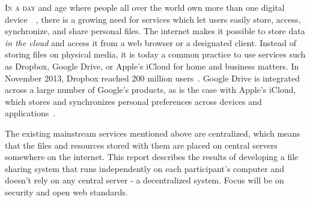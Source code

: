 \lettrine[lines=2, findent=2pt]{I}{n a day} and age where people all over the world own more than one digital device~\cite{OFCOMa:Online}~\cite{OFCOMb:Online}, there is a growing need for services which let users easily store, access, synchronize, and share personal files. The internet makes it possible to store data \emph{in the cloud} and access it from a web browser or a designated client. Instead of storing files on physical media, it is today a common practice to use services such as Dropbox, Google Drive, or Apple's iCloud for home and business matters. In November 2013, Dropbox reached 200 million users~\cite{Constine:2013:Online}. Google Drive is integrated across a large number of Google's products, as is the case with Apple's iCloud, which stores and synchronizes personal preferences across devices and applications~\cite{CloudTrend:Online}.

The existing mainstream services mentioned above are centralized, which means that the files and resources stored with them are placed on central servers somewhere on the internet. This report describes the results of developing a file sharing system that runs independently on each participant's computer and doesn't rely on any central server - a decentralized system. Focus will be on security and open web standards.







